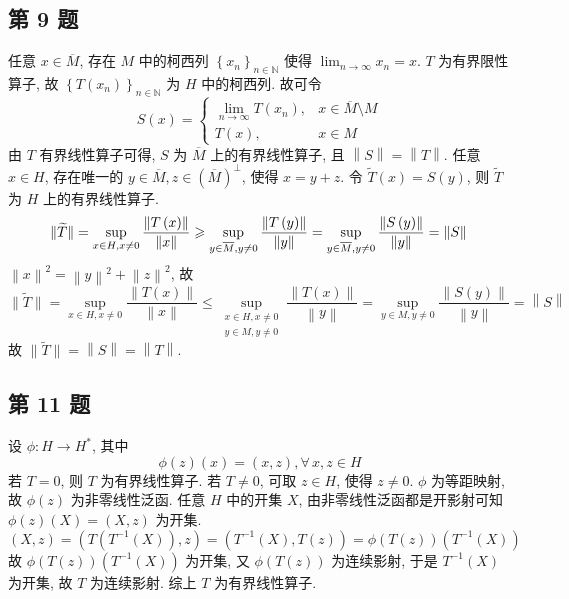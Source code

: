 \documentclass[\ROOT/main.tex]{subfiles}
\begin{document}
\subsection{第 9 题}
任意 $x \in \overline{M}$, 存在 $M$ 中的柯西列 $\left\{ x_n \right\}_{n \in \mathbb{N}}$ 使得 $\displaystyle \lim_{n \to \infty} x_n = x$.
$T$ 为有界限性算子, 故 $\left\{ T \left( x_n \right) \right\}_{n \in \mathbb{N}}$ 为 $H$ 中的柯西列.
故可令
\[
    S \left( x \right) = \begin{cases}
        \displaystyle \lim_{n \to \infty} T \left( x_n \right), & x \in \overline{M} \setminus M \\
        T \left( x \right), & x \in M
    \end{cases}
\]
由 $T$ 有界线性算子可得, $S$ 为 $\overline{M}$ 上的有界线性算子, 且 $\left\| S \right\| = \left\| T \right\|$.
任意 $x \in H$, 存在唯一的 $y \in \overline{M}, z \in \left( \overline{M} \right)^\bot$, 使得 $x = y + z$.
令 $\widetilde{T} \left( x \right) = S \left( y \right)$, 则 $\widetilde{T}$ 为 $H$ 上的有界线性算子.
\[
    \| \widetilde{T} \|
    =
    \sup_{x \in H, x \neq 0} \frac{\left\| T \left( x \right) \right\|}{\left\| x \right\|}
    \geqslant
    \sup_{y \in \overline{M}, y \neq 0} \frac{\left\| T \left( y \right) \right\|}{\left\| y \right\|}
    =
    \sup_{y \in \overline{M}, y \neq 0} \frac{\left\| S \left( y \right) \right\|}{\left\| y \right\|}
    =
    \left\| S \right\| \\
\]
$\left\| x \right\|^2 = \left\| y \right\|^2 + \left\| z \right\|^2$, 故
\[
    \| \widetilde{T} \|
    =
    \sup_{x \in H, x \neq 0} \frac{\left\| T \left( x \right) \right\|}{\left\| x \right\|}
    \leqslant
    \sup_{\substack{x \in H, x \neq 0 \\ y \in M, y \neq 0}} \frac{\left\| T \left( x \right) \right\|}{\left\| y \right\|}
    =
    \sup_{y \in M, y \neq 0} \frac{\left\| S \left( y \right) \right\|}{\left\| y \right\|}
    =
    \left\| S \right\|
\]
故 $\| \widetilde{T} \| = \left\| S \right\| = \left\| T \right\|$.

\subsection{第 11 题}
设 $\phi : H \to H^*$, 其中
\[
    \phi \left( z \right) \left( x \right) = \left( x, z \right)
    , \forall \, x, z \in H
\]
若 $T = 0$, 则 $T$ 为有界线性算子.
若 $T \neq 0$, 可取 $z \in H$, 使得 $z \neq 0$.
$\phi$ 为等距映射, 故 $\phi \left( z \right)$ 为非零线性泛函.
任意 $H$ 中的开集 $X$,
由非零线性泛函都是开影射可知 $\phi \left( z \right) \left( X \right) = \left( X, z \right)$ 为开集.
\[
    \left( X, z \right)
    = \left( T \left( T^{-1} \left( X \right) \right), z \right)    = \left( T^{-1} \left( X \right), T \left( z \right) \right)
    = \phi \left( T \left( z \right) \right) \left( T^{-1} \left( X \right) \right)
\]
故 $\phi \left( T \left( z \right) \right) \left( T^{-1} \left( X \right) \right)$ 为开集,
又 $\phi \left( T \left( z \right) \right)$ 为连续影射, 于是 $T^{-1} \left( X \right)$ 为开集, 故 $T$ 为连续影射.
综上 $T$ 为有界线性算子.
\end{document}
